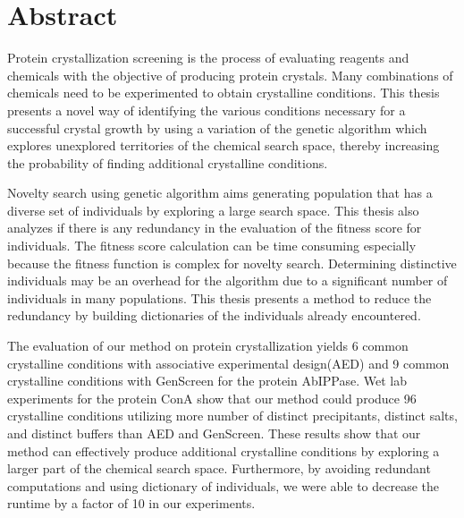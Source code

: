 \chapter*{Abstract}
\makeabstract


Protein crystallization screening is the process of evaluating reagents and chemicals with the objective of producing protein crystals. Many combinations of chemicals need to be experimented to obtain crystalline conditions. This thesis presents a novel way of identifying the various conditions necessary for a successful crystal growth by using a variation of the genetic algorithm which explores unexplored territories of the chemical search space, thereby increasing the probability of finding additional crystalline conditions.

Novelty search using genetic algorithm aims generating population that has a diverse set of individuals by exploring a large search space.
This thesis also analyzes if there is any redundancy in the evaluation of the fitness score for 
individuals. The fitness score calculation can be time consuming especially because the fitness function is complex for novelty search. 
Determining distinctive individuals may be an overhead for the algorithm due to a significant number of individuals in many populations.
This thesis presents a method to reduce the redundancy by building dictionaries of the individuals already encountered.


The evaluation of our method on protein crystallization yields 6 common crystalline conditions with associative experimental design(AED) and 9 common crystalline conditions with GenScreen for the protein AbIPPase. Wet lab experiments for the protein ConA show that our method could produce 96 crystalline conditions utilizing more number of distinct precipitants, distinct salts, and distinct buffers than AED and GenScreen. 
These results show that our method can effectively produce additional crystalline conditions by exploring a larger part of the chemical search space. Furthermore, by avoiding redundant computations and using dictionary of individuals, we were able to decrease the runtime by a factor of 10 in our experiments.%






\abstractsig
